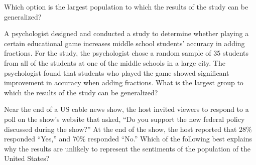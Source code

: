 \vspace{0.5em}

\noindent Which option is the largest population to which the results of the study can be generalized?




\vspace{2em}

\noindent\markforreview
\vspace{1em}

A psychologist designed and conducted a study to determine whether playing a certain educational game  
increases middle school students’ accuracy in adding fractions.  
For the study, the psychologist chose a random sample of 35 students from all of the students  
at one of the middle schools in a large city. The psychologist found that students who played the game  
showed significant improvement in accuracy when adding fractions.  
What is the largest group to which the results of the study can be generalized?

\vspace{0.75em}


\vspace{2em}

\noindent\markforreview
\vspace{1em}

Near the end of a US cable news show, the host invited viewers to respond to a poll on the show’s website that asked,  
“Do you support the new federal policy discussed during the show?” At the end of the show, the host reported that  
28\% responded “Yes,” and 70\% responded “No.”  
Which of the following best explains why the results are unlikely to represent the sentiments of the population of the United States?

\vspace{0.75em}


